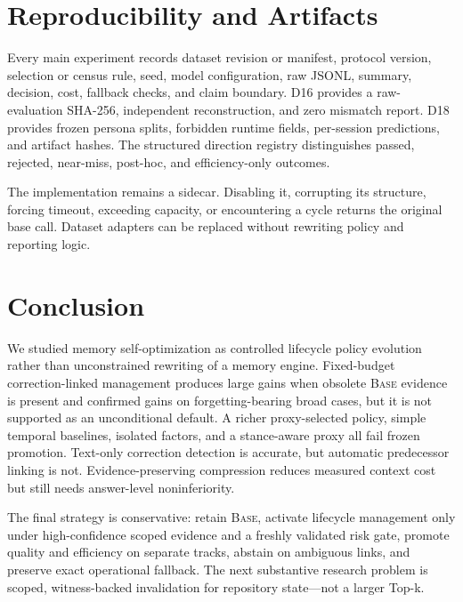 \documentclass[10pt]{article}
\newcommand{\base}{\textsc{Base}\xspace}
\begin{document}
\section{Reproducibility and Artifacts}

Every main experiment records dataset revision or manifest, protocol version, selection or census rule, seed, model configuration, raw JSONL, summary, decision, cost, fallback checks, and claim boundary. D16 provides a raw-evaluation SHA-256, independent reconstruction, and zero mismatch report. D18 provides frozen persona splits, forbidden runtime fields, per-session predictions, and artifact hashes. The structured direction registry distinguishes passed, rejected, near-miss, post-hoc, and efficiency-only outcomes.

The implementation remains a sidecar. Disabling it, corrupting its structure, forcing timeout, exceeding capacity, or encountering a cycle returns the original base call. Dataset adapters can be replaced without rewriting policy and reporting logic.

\section{Conclusion}

We studied memory self-optimization as controlled lifecycle policy evolution rather than unconstrained rewriting of a memory engine. Fixed-budget correction-linked management produces large gains when obsolete \base evidence is present and confirmed gains on forgetting-bearing broad cases, but it is not supported as an unconditional default. A richer proxy-selected policy, simple temporal baselines, isolated factors, and a stance-aware proxy all fail frozen promotion. Text-only correction detection is accurate, but automatic predecessor linking is not. Evidence-preserving compression reduces measured context cost but still needs answer-level noninferiority.

The final strategy is conservative: retain \base, activate lifecycle management only under high-confidence scoped evidence and a freshly validated risk gate, promote quality and efficiency on separate tracks, abstain on ambiguous links, and preserve exact operational fallback. The next substantive research problem is scoped, witness-backed invalidation for repository state---not a larger Top-k.


\small

\end{document}

